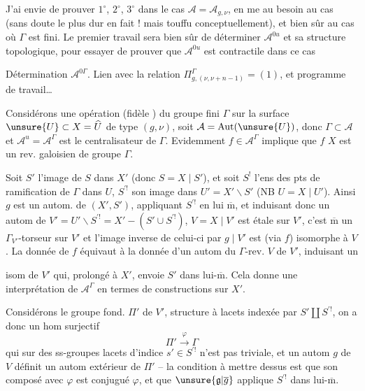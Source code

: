 J'ai envie de prouver  $1^\circ$, $2^\circ$, $3^\circ$ dans le cas $\mathcal A=\mathcal A_{g,\nu}$, en me  au besoin au cas  (sans doute le plus dur en fait ! \unsure{\}} mais   touffu conceptuellement), et bien sûr au cas où $\Gamma$ est fini. Le premier travail sera bien sûr  de déterminer $\mathcal A^{0u}$ et sa structure topologique, pour essayer de prouver que $\mathcal A^{0u}$ est contractile dans ce cas

  Détermination  $\mathcal A^{0\Gamma}$. Lien avec la relation $\Pi_{g,(\nu,\nu+n-1)}^\Gamma=(1)$, et programme de travail\ldots

Considérons une opération (fidèle ) du groupe fini $\Gamma$ sur la surface $\unsure{U}\subset X=\widehat U$ de type $(g,\nu)$,  soit $\mathcal A=\operatorname{Aut}(\unsure{U})$, donc $\Gamma\subset\mathcal A$ et $\mathcal A^{u}=\mathcal A^\Gamma$ est le centralisateur de $\Gamma$.  Evidemment $f\in\mathcal A^\Gamma$ implique que $f$    $X$ est un rev. galoisien de groupe $\Gamma$.

Soit $S'$ l'image de $S$ dans $X'$ (donc $S=X\mid S'$), et soit $S^!$ l'ens des pts de ramification de $\Gamma$ dans $U$, $S^{\prime!}$ son image dans $U'=X'\backslash S'$ (NB $U=X\mid U'$). Ainsi $g$ est un autom. de $(X',S')$, appliquant $S^{\prime!}$ en lui $\overline{\mathrm m}$, et  induisant donc un autom de $V'=U'\backslash S^{\prime!}=X'-(S'\cup S^{\prime!})$,     $V=X\mid V'$ est étale sur $V'$, c'est $\overline{\mathrm m}$ un $\Gamma_{V'}$-torseur sur $V'$ et l'image inverse de celui-ci par $g\mid V'$ est (via $f$) isomorphe à $V$. La donnée de $f$ équivaut à la donnée d'un autom du  $\Gamma$-rev. $V$ de $V'$, induisant un

isom de $V'$ qui, prolongé à $X'$, envoie $S'$ dans lui-$\overline{\mathrm m}$. Cela donne une interprétation de $\mathcal A^\Gamma$ en termes de constructions sur $X'$.

Considérons le groupe fond. $\Pi'$ de $V'$,  structure à lacets indexée par $S'\amalg S^{\prime!}$, on a donc un hom surjectif
\[
\Pi'\xrightarrow{\varphi}\Gamma
\]
qui sur  des ss-groupes  lacets d'indice $s'\in S^{\prime!}$ n'est pas triviale, et un autom $g$ de $V$ définit un autom extérieur  de $\Pi'$ -- la condition à mettre dessus est que son composé avec $\varphi$ est conjugué  $\varphi$, et que $\unsure{\mathfrak g|\overline g}$ applique $S^{\prime!}$ dans lui-$\overline{\mathrm m}$.

